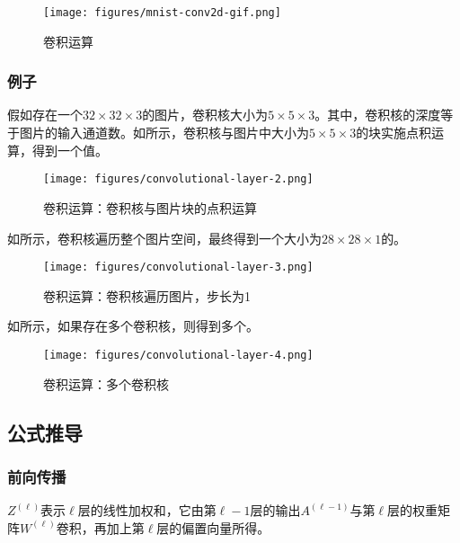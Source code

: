 \begin{content}
\begin{content}
\begin{figure}[H]
\centering
\texttt{[image: figures/mnist-conv2d-gif.png]}
\caption{卷积运算}
 \label{fig:mnist-conv2d-gif}
\end{figure}

\subsubsection{例子}

假如存在一个$32 \times 32 \times 3$的图片，卷积核大小为$5 \times 5 \times 3$。其中，卷积核的深度等于图片的输入通道数。如所示，卷积核与图片中大小为$5 \times 5 \times 3$的块实施点积运算，得到一个值。

\begin{figure}[H]
\centering
\texttt{[image: figures/convolutional-layer-2.png]}
\caption{卷积运算：卷积核与图片块的点积运算}
 \label{fig:mnist-conv-1dot}
\end{figure}

如所示，卷积核遍历整个图片空间，最终得到一个大小为$28 \times 28 \times 1$的。

\begin{figure}[H]
\centering
\texttt{[image: figures/convolutional-layer-3.png]}
\caption{卷积运算：卷积核遍历图片，步长为1}
 \label{fig:mnist-conv-ndot}
\end{figure}

如所示，如果存在多个卷积核，则得到多个。

\begin{figure}[H]
\centering
\texttt{[image: figures/convolutional-layer-4.png]}
\caption{卷积运算：多个卷积核}
 \label{fig:mnist-conv-multi-filters}
\end{figure}

\subsection{公式推导}

\subsubsection{前向传播}

$Z^{(\ell )}$表示$\ell$层的线性加权和，它由第$\ell - 1$层的输出$A^{(\ell  - 1)}$与第$\ell$层的权重矩阵$W^{(\ell )}$卷积，再加上第$\ell$层的偏置向量所得。


\end{content}
\end{content}
